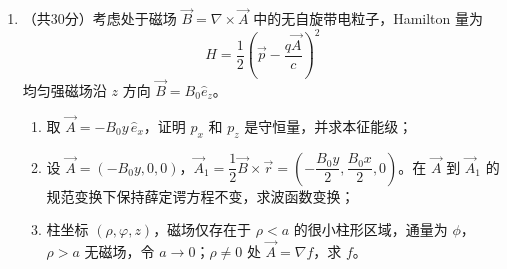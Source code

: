 \begin{enumerate}
{\begin{enumerate}
		由定态方程 $\psi_0''=\dfrac{2m}{\hbar^2}(V-E_0)\psi_0$，且基态 $\psi_0(x)>0$ 处处成立，凹凸性完全由 $V-E_0$ 的符号决定：
		\begin{align*}
			\psi_0''\begin{cases}<0,&|x|<x_t\ \text{（经典允许区，}V<E_0\text{，曲线开口向下）}\\>0,&|x|>x_t\ \text{（经典禁戒区，}V>E_0\text{，曲线开口向上）}\end{cases}
		\end{align*}
		即允许区内 $\psi_0''<0$，曲线呈峰形向下弯曲；禁戒区内 $\psi_0''>0$，曲线向上翘起并指数衰减趋于零。

		\item 基态几率密度 $|\psi_0(x)|^2=\sqrt{\dfrac{m\Omega}{\pi\hbar}}\,e^{-x^2/x_t^2}$。禁戒区几率为
		\begin{align*}
			P_{\text{禁}}=2\int_{x_t}^{+\infty}|\psi_0(x)|^2\,dx=\frac{2}{\sqrt{\pi}\,x_t}\int_{x_t}^{+\infty}e^{-x^2/x_t^2}\,dx
		\end{align*}
		令 $\xi=x/x_t$：
		\begin{align*}
			P_{\text{禁}}=\frac{2}{\sqrt{\pi}}\int_1^{+\infty}e^{-\xi^2}\,d\xi=\frac{2}{\sqrt{\pi}}\left(\frac{\sqrt{\pi}}{2}-\int_0^1 e^{-\xi^2}\,d\xi\right)=1-\operatorname{erf}(1)
		\end{align*}
		即
		\begin{align*}
			P_{\text{禁}}=1-\operatorname{erf}(1)=\operatorname{erfc}(1)\approx 0.1573
		\end{align*}
		约有 $15.73\%$ 的几率在经典禁戒区中找到粒子，这源于量子穿透效应，即基态波函数在经典禁戒区内仍有非零的指数衰减尾巴。
	\end{enumerate}
	}

	\item
	（共30分）考虑处于磁场 $\vec{B}=\nabla\times\vec{A}$ 中的无自旋带电粒子，Hamilton 量为
	\[
	H=\frac{1}{2}\left(\vec{p}-\frac{q\vec{A}}{c}\right)^2
	\]
	均匀强磁场沿 $z$ 方向 $\vec{B}=B_0\hat{e}_z$。
	\begin{enumerate}
		\item 取 $\vec{A}=-B_0 y\,\hat{e}_x$，证明 $p_x$ 和 $p_z$ 是守恒量，并求本征能级；
		\item 设 $\vec{A}=(-B_0 y,0,0)$，$\vec{A}_1=\dfrac{1}{2}\vec{B}\times\vec{r}=\left(-\dfrac{B_0 y}{2},\dfrac{B_0 x}{2},0\right)$。在 $\vec{A}$ 到 $\vec{A}_1$ 的规范变换下保持薛定谔方程不变，求波函数变换；
		\item 柱坐标 $(\rho,\varphi,z)$，磁场仅存在于 $\rho<a$ 的很小柱形区域，通量为 $\phi$，$\rho>a$ 无磁场，令 $a\to 0$；$\rho\neq 0$ 处 $\vec{A}=\nabla f$，求 $f$。
	\end{enumerate}


\end{enumerate}
